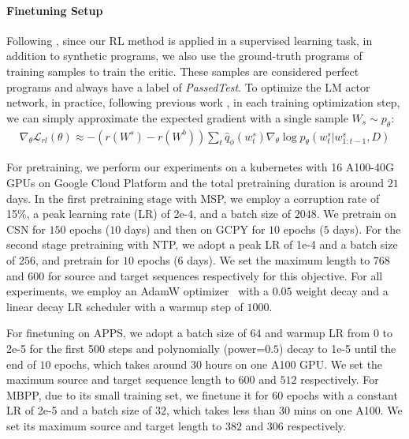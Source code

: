 \documentclass{article}
\begin{document}
\paragraph{Finetuning Setup}
Following \citep{bahdanau2016actor}, since our RL method is applied in a supervised learning task, in addition to synthetic programs, we also use the ground-truth programs of training samples to train the critic.
These samples are considered perfect programs and always have a label of \emph{PassedTest}. 
To optimize the LM actor network, in practice, following previous work \citep{bahdanau2016actor, rennie2017self, wang2018video}, 
in each training optimization step, we can simply approximate the expected gradient with a single sample $W_s \sim p_\theta$:
\begin{align}
    \nabla_\theta \mathcal{L}_{rl}(\theta) \approx - (r(W^s)-r(W^b))  \sum_t \hat{q}_\phi(w^s_t) \nabla_\theta \log p_\theta(w^s_t|w^s_{1:t-1}, D)
\end{align}

For pretraining, we perform our experiments on a kubernetes with 16 A100-40G GPUs on Google Cloud Platform and the total pretraining duration is around $21$ days.
In the first  pretraining stage with MSP, we employ a corruption rate of 15\%, a peak learning rate (LR) of 2e-4, and a batch size of $2048$. We pretrain on CSN for $150$ epochs ($10$ days) and then on GCPY for $10$ epochs ($5$ days). 
For the second stage pretraining with NTP, we adopt a peak LR of 1e-4 and a batch size of $256$, and pretrain for $10$ epochs (6 days). We set the maximum length to $768$ and $600$ for source and target sequences respectively for this objective.
For all  experiments, we employ an AdamW optimizer~\citep{DBLP:conf/iclr/LoshchilovH19} with a $0.05$ weight decay and a linear decay LR scheduler with a warmup step of $1000$. 

For finetuning on APPS, we adopt a batch size of $64$ and warmup LR from 0 to 2e-5 for the first 500 steps and polynomially (power=$0.5$) decay to 1e-5 until the end of $10$ epochs, which takes around $30$ hours on one A100 GPU. We set the maximum source and target sequence length to $600$ and $512$ respectively. For MBPP, due to its small training set, we finetune it for $60$ epochs with a constant LR of 2e-5 and a batch size of $32$, which takes less than $30$ mins on one A100. We set its  maximum source and target  length to $382$ and $306$ respectively.

\fi
\end{document}

